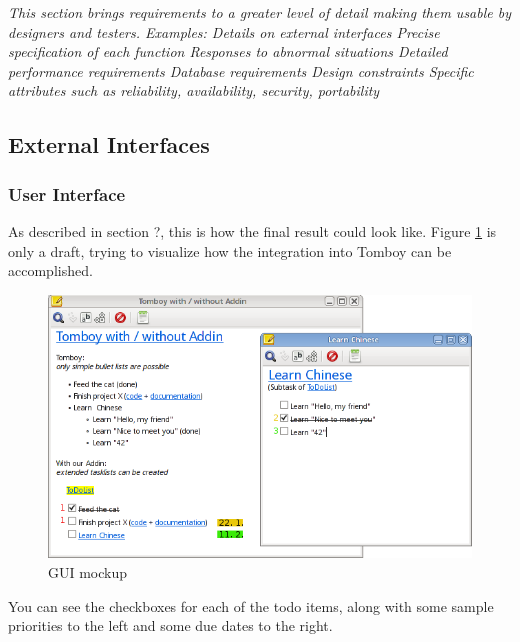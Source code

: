 \textit{This section brings requirements to a greater level of detail making them usable by designers and testers. Examples:
Details on external interfaces
Precise specification of each function
Responses to abnormal situations
Detailed performance requirements
Database requirements
Design constraints
Specific attributes such as reliability, availability, security, portability}

\subsection{External Interfaces}
\label{requirements:interfaces}

	\subsubsection{User Interface}
	\label{requirements:interfaces:user}
        
        As described in section ?, this is how the final result could look like. Figure \ref{gui} is only a draft, trying to visualize how the integration into Tomboy can be accomplished.
        \begin{figure}[h]
          \includegraphics[width=\textwidth]{graphics/Screenshot_cropped_edited.png}
          \caption{GUI mockup}
          \label{gui}
        \end{figure}
        You can see the checkboxes for each of the todo items, along with some sample priorities to the left and some due dates to the right.
	
	
